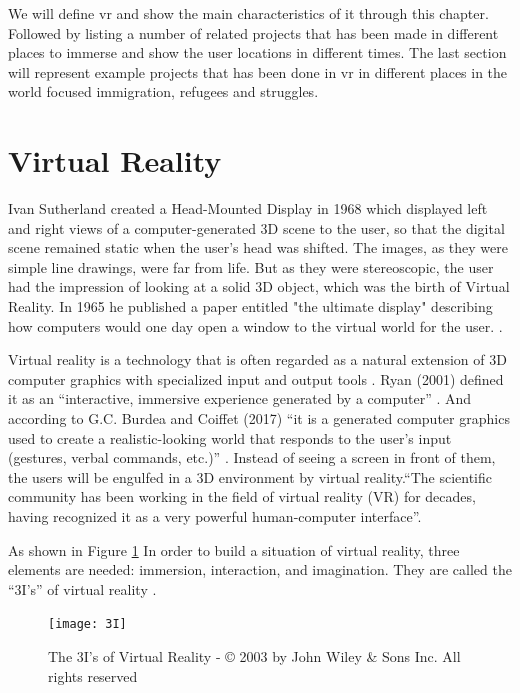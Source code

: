 We will define \acrfull{vr} and show the main characteristics of it through this chapter. Followed by listing a number of related projects that has been made in different places to immerse and show the user locations in different times. The last section will represent example projects that has been done in \acrshort{vr} in different places in the world focused immigration, refugees and struggles.   

\section{Virtual Reality}
Ivan Sutherland created a Head-Mounted Display in 1968 which displayed left and right views of a computer-generated 3D scene to the user, so that the digital scene remained static when the user's head was shifted. The images, as they were simple line drawings, were far from life. But as they were stereoscopic, the user had the impression of looking at a solid 3D object, which was the birth of Virtual Reality. In 1965 he published a paper entitled "the ultimate display" describing how computers would one day open a window to the virtual world for the user. \citep{Vince2011}.  

Virtual reality is a technology that is often regarded as a natural extension of 3D computer graphics with specialized input and output tools \citep{Jayaram1997}. Ryan (2001) defined it as an “interactive, immersive experience generated by a computer” \citep{Ryan2001}. And according to G.C. Burdea and Coiffet (2017) “it is a generated computer graphics used to create a realistic-looking world that responds to the user’s input (gestures, verbal commands, etc.)” \cite[p.20]{burdea2017virtual}. Instead of seeing a screen in front of them, the users will be engulfed in a 3D environment by virtual reality.“The scientific community has been working in the field of virtual reality (VR) for decades, having recognized it as a very powerful human-computer interface”\cite[p.19]{burdea2017virtual}. 

As shown in Figure \ref{fig:3I} In order to build a situation of virtual reality, three elements are needed:  immersion, interaction, and imagination. They are called the “3I’s” of virtual reality \citep{Hu2016,burdea2017virtual}.

\begin{figure} %
    \centering
    \texttt{[image: 3I]}
    \caption{The 3I's of Virtual Reality - © 2003 by John Wiley \& Sons Inc. All rights
reserved}
    \label{fig:3I}
\end{figure}



